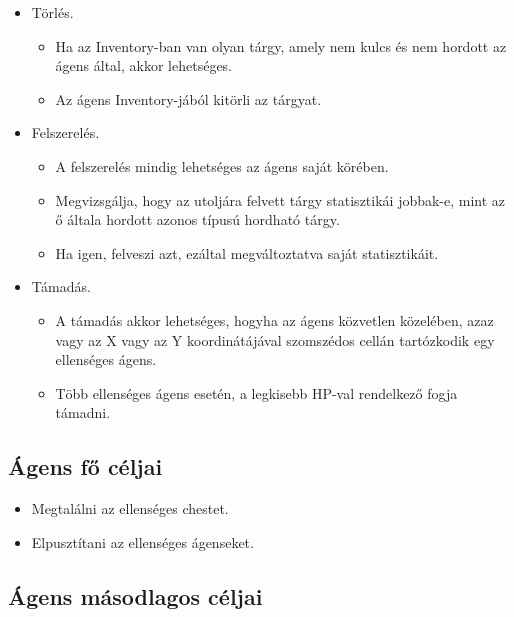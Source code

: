 \begin{itemize}
    \item Törlés. 
    
    \begin{itemize}
        \item Ha az Inventory-ban van olyan tárgy, amely nem kulcs és nem hordott az ágens által, akkor lehetséges.
        \item Az ágens Inventory-jából kitörli az tárgyat.
    \end{itemize}

    \item Felszerelés. 
    
    \begin{itemize}
        \item A felszerelés mindig lehetséges az ágens saját körében.
        \item Megvizsgálja, hogy az utoljára felvett tárgy statisztikái jobbak-e, mint az ő általa hordott azonos típusú hordható tárgy.
        \item Ha igen, felveszi azt, ezáltal megváltoztatva saját statisztikáit.
    \end{itemize}

    \item Támadás. 
    
    \begin{itemize}
        \item A támadás akkor lehetséges, hogyha az ágens közvetlen közelében, azaz vagy az X vagy az Y koordinátájával szomszédos cellán tartózkodik egy ellenséges ágens.
        \item Több ellenséges ágens esetén, a legkisebb HP-val rendelkező fogja támadni.
    \end{itemize}

\end{itemize}

\subsection{Ágens fő céljai}

\begin{itemize}
    \item Megtalálni az ellenséges chestet.
    \item Elpusztítani az ellenséges ágenseket.
\end{itemize}

\subsection{Ágens másodlagos céljai}

